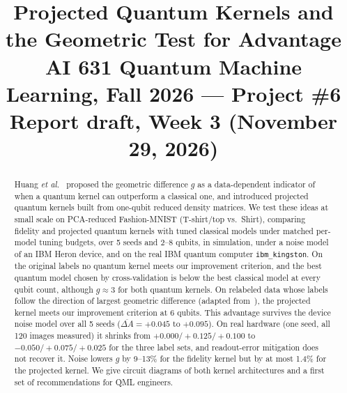 \documentclass[conference]{IEEEtran}
\begin{document}
\title{Projected Quantum Kernels and the Geometric Test for Advantage\\
\large AI 631 Quantum Machine Learning, Fall 2026 --- Project \#6\\
Report draft, Week 3 (November 29, 2026)}

\author{
}

\maketitle

\begin{abstract}
Huang \textit{et al.}~\cite{huang2021} proposed the geometric difference $g$ as a data-dependent indicator of when a quantum kernel can outperform a classical one, and introduced projected quantum kernels built from one-qubit reduced density matrices. We test these ideas at small scale on PCA-reduced Fashion-MNIST (T-shirt/top vs.\ Shirt), comparing fidelity and projected quantum kernels with tuned classical models under matched per-model tuning budgets, over 5 seeds and 2--8 qubits, in simulation, under a noise model of an IBM Heron device, and on the real IBM quantum computer \texttt{ibm\_kingston}. On the original labels no quantum kernel meets our improvement criterion, and the best quantum model chosen by cross-validation is below the best classical model at every qubit count, although $g\approx3$ for both quantum kernels. On relabeled data whose labels follow the direction of largest geometric difference (adapted from~\cite{huang2021}), the projected kernel meets our improvement criterion at 6 qubits. This advantage survives the device noise model over all 5 seeds ($\overline{\Delta A}=+0.045$ to $+0.095$). On real hardware (one seed, all 120 images measured) it shrinks from $+0.000/+0.125/+0.100$ to $-0.050/+0.075/+0.025$ for the three label sets, and readout-error mitigation does not recover it. Noise lowers $g$ by 9--13\% for the fidelity kernel but by at most 1.4\% for the projected kernel. We give circuit diagrams of both kernel architectures and a first set of recommendations for QML engineers.
\end{abstract}
\end{document}
